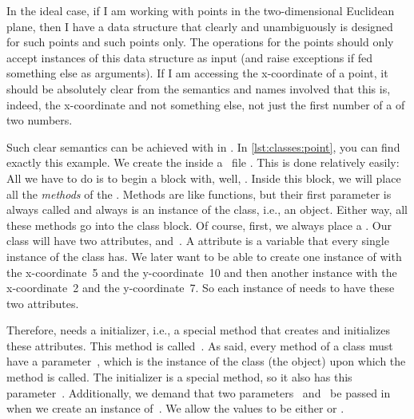 In the ideal case, if I am working with points in the two-dimensional Euclidean plane, then I have a data structure that clearly and unambiguously is designed for such points and such points only.
The operations for the points should only accept instances of this data structure as input (and raise exceptions if fed something else as arguments).
If I am accessing the x\nobreakdashes-coordinate of a point, it should be absolutely clear from the semantics and names involved that this is, indeed, the x\nobreakdashes-coordinate and not something else, not just the first number of a  of two numbers.

Such clear semantics can be achieved with  in \python.
In \cref{lst:classes:point}, you can find exactly this example.
We create the  inside a \python\ file .
This is done relatively easily:
All we have to do is to begin a block with, well, .
Inside this block, we will place all the \emph{methods} of the .
Methods are like functions, but their first parameter is always called  and always is an instance of the class, i.e., an object.
Either way, all these methods go into the class block.
Of course, first, we always place a .%
%
%
%
Our class  will have two attributes,  and~.
A attribute is a variable that every single instance of the class has.
We later want to be able to create one instance of  with the x\nobreakdashes-coordinate~5 and the y\nobreakdashes-coordinate~10 and then another instance with the x\nobreakdashes-coordinate~2 and the y\nobreakdashes-coordinate~7.
So each instance of  needs to have these two attributes.

Therefore,  needs a initializer, i.e., a special method that creates and initializes these attributes.
This method is called~.
As said, every method of a class must have a parameter~, which is the instance of the class (the object) upon which the method is called.
The initializer  is a special method, so it also has this parameter~.
Additionally, we demand that two parameters~ and~ be passed in when we create an instance of~.
We allow the values to be either  or .

